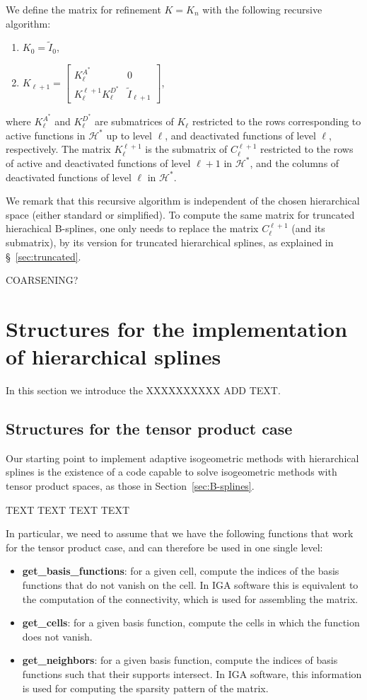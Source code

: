 \documentclass[a4paper]{siamltex1213}
\newcommand{\Rd}{\color{red}}
\renewcommand{\Rd}{\color{black}}
\newcommand\HH{\mathcal H}
\let\tilde\widetilde
\begin{document}
We define the matrix for refinement $K = K_n$ with the following recursive algorithm:
\begin{enumerate}
\item $K_0 = \tilde I_0$,
\item $K_{\ell+1} = \left [ 
\begin{array}{cc}
K^{A^*}_\ell & 0 \\
K_\ell^{\ell+1} K^{D^*}_\ell & \tilde I_{\ell+1}
\end{array}
\right]$,
\end{enumerate}
where $K_\ell^{A^*}$ and $K_\ell^{D^*}$ are submatrices of $K_\ell$ restricted to the rows corresponding to {\Rd active functions in $\HH^*$ up to level $\ell$, and deactivated functions of level $\ell$, respectively. The matrix $K_\ell^{\ell+1}$ is the submatrix of $C_\ell^{\ell+1}$ restricted to the rows of active and deactivated functions of level $\ell+1$ in $\HH^*$, and the columns of deactivated functions of level $\ell$ in $\HH^*$. }

We remark that this recursive algorithm is independent of the chosen hierarchical space (either standard or simplified). To compute the same matrix for truncated hierachical B-splines, one only needs to replace the matrix $C_\ell^{\ell+1}$ (and its submatrix), by its version for truncated hierarchical splines, as explained in \S~\ref{sec:truncated}.

{\Rd COARSENING?}

\section{Structures for the implementation of hierarchical splines}
In this section we introduce the {\Rd XXXXXXXXXX ADD TEXT}.

\subsection{Structures for the tensor product case}
Our starting point to implement adaptive isogeometric methods with hierarchical splines is the existence of a code capable to solve isogeometric methods with tensor product spaces, as those in Section~\ref{sec:B-splines}.

{\Rd TEXT TEXT TEXT TEXT}

In particular, we need to assume that we have the following functions that work for the tensor product case, and can therefore be used in one single level:
\begin{itemize}
\item {\bf get\_basis\_functions}: for a given cell, compute the indices of the basis functions that do not vanish on the cell. In IGA software this is equivalent to the computation of the connectivity, which is used for assembling the matrix.
\item {\bf get\_cells}: for a given basis function, compute the cells in which the function does not vanish.
\item {\bf get\_neighbors}: for a given basis function, compute the indices of basis functions such that their supports intersect. In IGA software, this information is used for computing the sparsity pattern of the matrix.
\end{itemize}
\end{document}
